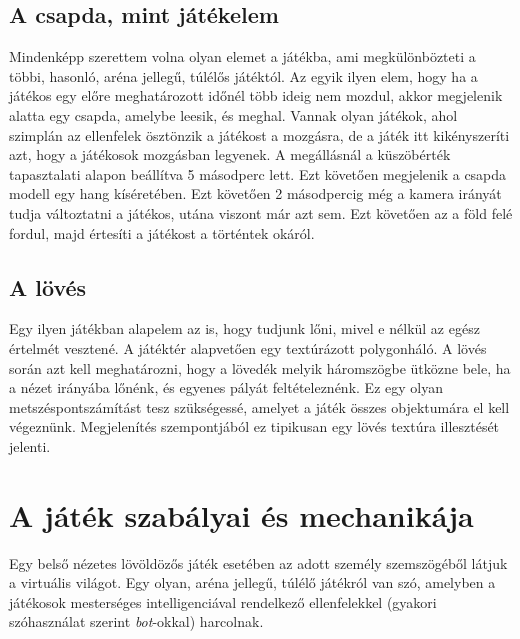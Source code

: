 \subsection{A csapda, mint játékelem}

Mindenképp szerettem volna olyan elemet a játékba, ami megkülönbözteti a többi, hasonló, aréna jellegű, túlélős játéktól. Az egyik ilyen elem, hogy ha a játékos egy előre meghatározott időnél több ideig nem mozdul, akkor megjelenik alatta egy csapda, amelybe leesik, és meghal. Vannak olyan játékok, ahol szimplán az ellenfelek ösztönzik a játékost a mozgásra, de a játék itt kikényszeríti azt, hogy a játékosok mozgásban legyenek. A megállásnál a küszöbérték tapasztalati alapon beállítva 5 másodperc lett. Ezt követően megjelenik a csapda modell egy hang kíséretében. Ezt követően 2 másodpercig még a kamera irányát tudja változtatni a játékos, utána viszont már azt sem. Ezt követően az a föld felé fordul, majd értesíti a játékost a történtek okáról.

\subsection{A lövés}

Egy ilyen játékban alapelem az is, hogy tudjunk lőni, mivel e nélkül az egész értelmét vesztené. A játéktér alapvetően egy textúrázott polygonháló. A lövés során azt kell meghatározni, hogy a lövedék melyik háromszögbe ütközne bele, ha a nézet irányába lőnénk, és egyenes pályát feltételeznénk. Ez egy olyan metszéspontszámítást tesz szükségessé, amelyet a játék összes objektumára el kell végeznünk. Megjelenítés szempontjából ez tipikusan egy lövés textúra illesztését jelenti.


\section{A játék szabályai és mechanikája}

Egy belső nézetes lövöldözős játék esetében az adott személy szemszögéből látjuk a virtuális világot. Egy olyan, aréna jellegű, túlélő játékról van szó, amelyben a játékosok mesterséges intelligenciával rendelkező ellenfelekkel (gyakori szóhasználat szerint \textit{bot}-okkal) harcolnak.

